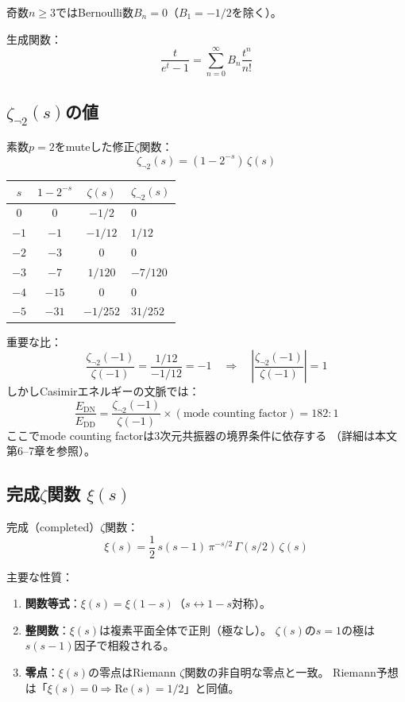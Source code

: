 \documentclass[11pt,a4paper]{article}
\newcommand{\DN}{\mathrm{DN}}
\newcommand{\DD}{\mathrm{DD}}
\begin{document}
\noindent
奇数$n \geq 3$ではBernoulli数$B_n = 0$（$B_1 = -1/2$を除く）。

生成関数：
\[
\frac{t}{e^t - 1} = \sum_{n=0}^{\infty} B_n \frac{t^n}{n!}
\]


\subsection{$\zeta_{\neg 2}(s)$の値}

素数$p = 2$をmuteした修正$\zeta$関数：
\[
\zeta_{\neg 2}(s) = (1 - 2^{-s})\,\zeta(s)
\]

\begin{center}
\begin{tabular}{cccl}
\toprule
$s$ & $1 - 2^{-s}$ & $\zeta(s)$ & $\zeta_{\neg 2}(s)$ \\
\midrule
$0$ & $0$ & $-1/2$ & $0$ \\
$-1$ & $-1$ & $-1/12$ & $1/12$ \\
$-2$ & $-3$ & $0$ & $0$ \\
$-3$ & $-7$ & $1/120$ & $-7/120$ \\
$-4$ & $-15$ & $0$ & $0$ \\
$-5$ & $-31$ & $-1/252$ & $31/252$ \\
\bottomrule
\end{tabular}
\end{center}

\noindent
重要な比：
\[
\frac{\zeta_{\neg 2}(-1)}{\zeta(-1)} = \frac{1/12}{-1/12} = -1
\quad\Longrightarrow\quad
\left|\frac{\zeta_{\neg 2}(-1)}{\zeta(-1)}\right| = 1
\]
しかしCasimirエネルギーの文脈では：
\[
\frac{E_{\DN}}{E_{\DD}} = \frac{\zeta_{\neg 2}(-1)}{\zeta(-1)}
\times (\text{mode counting factor}) = 182:1
\]
ここでmode counting factorは3次元共振器の境界条件に依存する
（詳細は本文第6--7章を参照）。


\subsection{完成$\zeta$関数 $\xi(s)$}

完成（completed）$\zeta$関数：
\[
\xi(s) = \frac{1}{2}\,s(s-1)\,\pi^{-s/2}\,\Gamma(s/2)\,\zeta(s)
\]

主要な性質：
\begin{enumerate}
\item \textbf{関数等式}：$\xi(s) = \xi(1-s)$（$s \leftrightarrow 1-s$対称）。
\item \textbf{整関数}：$\xi(s)$は複素平面全体で正則（極なし）。
$\zeta(s)$の$s = 1$の極は$s(s-1)$因子で相殺される。
\item \textbf{零点}：$\xi(s)$の零点はRiemann $\zeta$関数の非自明な零点と一致。
Riemann予想は「$\xi(s) = 0 \Rightarrow \mathrm{Re}(s) = 1/2$」と同値。
\end{enumerate}
\end{document}

